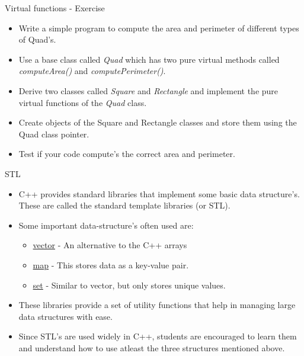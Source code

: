 \documentclass[aspectratio=169]{beamer}
\begin{document}
\begin{frame}[fragile]{Virtual functions - Exercise}
	\begin{itemize}
		\item Write a simple program to compute the area and perimeter of different types of Quad's.
		\item Use a base class called \textit{Quad} which has two pure virtual methods called \textit{computeArea()} and \textit{computePerimeter()}. 
		\item Derive two classes called \textit{Square} and \textit{Rectangle} and implement the pure virtual functions of the \textit{Quad} class.
		\item Create objects of the Square and Rectangle classes and store them using the Quad class pointer.
		\item Test if your code compute's the correct area and perimeter.
	\end{itemize}
\end{frame}

\begin{frame}[fragile]{STL}
	\begin{itemize}
		\item C++ provides standard libraries that implement some basic data structure's. These are called the standard template libraries (or STL).
		\item Some important data-structure's often used are:
		\begin{itemize}
			\item \href{http://www.cplusplus.com/reference/vector/vector/}{vector} - An alternative to the C++ arrays
			\item \href{http://www.cplusplus.com/reference/map/map/}{map} - This stores data as a key-value pair.
			\item \href{http://www.cplusplus.com/reference/set/set/}{set} - Similar to vector, but only stores unique values.
		\end{itemize}
		\item These libraries provide a set of utility functions that help in managing large data structures with ease.
		\item Since STL's are used widely in C++, students are encouraged to learn them and understand how to use atleast the three structures mentioned above.
	\end{itemize}
\end{frame}
\end{document}
